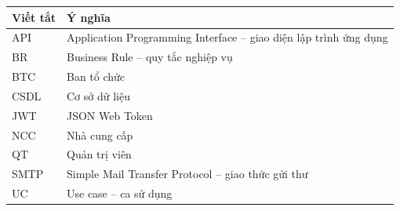 \begin{longtable}{p{3cm}p{11.5cm}}
\toprule
\textbf{Viết tắt} & \textbf{Ý nghĩa}\\
\midrule
API & Application Programming Interface -- giao diện lập trình ứng dụng\\
BR & Business Rule -- quy tắc nghiệp vụ\\
BTC & Ban tổ chức\\
CSDL & Cơ sở dữ liệu\\
JWT & JSON Web Token\\
NCC & Nhà cung cấp\\
QT & Quản trị viên\\
SMTP & Simple Mail Transfer Protocol -- giao thức gửi thư\\
UC & Use case -- ca sử dụng\\
\bottomrule
\end{longtable}
